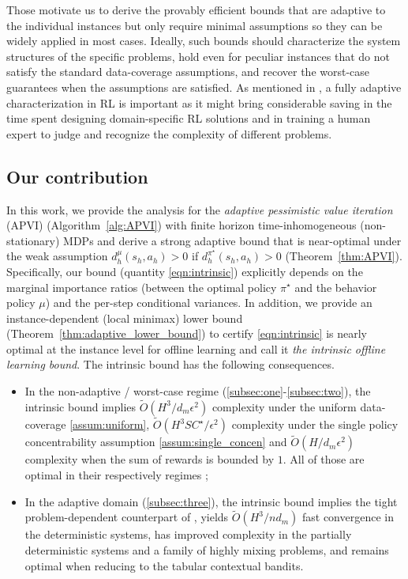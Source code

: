 Those motivate us to derive the provably efficient bounds that are adaptive to the individual instances but only require minimal assumptions so they can be widely applied in most cases. Ideally, such bounds should characterize the system structures of the specific problems, hold even for peculiar instances that do not satisfy the standard data-coverage assumptions, and recover the worst-case guarantees when the assumptions are satisfied. As mentioned in \cite{zanette2019tighter}, a fully adaptive characterization in RL is important as it might bring considerable saving in the time spent designing domain-specific RL solutions and in training a human expert to judge and recognize the complexity of different problems.

\subsection{Our contribution}\label{sec:contribution}


In this work, we provide the analysis for the \emph{adaptive pessimistic value iteration} (APVI) (Algorithm~\ref{alg:APVI}) with finite horizon time-inhomogeneous (non-stationary) MDPs and derive a strong adaptive bound that is near-optimal under the weak assumption $d^\mu_h(s_h,a_h)>0$ if $d^{\pi^\star}_h(s_h,a_h)>0$ (Theorem~\ref{thm:APVI}). Specifically, our bound (quantity \eqref{eqn:intrinsic}) explicitly depends on the marginal importance ratios (between the optimal policy $\pi^\star$ and the behavior policy $\mu$) and the per-step conditional variances. In addition, we provide an instance-dependent (local minimax) lower bound (Theorem~\ref{thm:adaptive_lower_bound}) to certify \eqref{eqn:intrinsic} is nearly optimal at the instance level for offline learning and call it \emph{the intrinsic offline learning bound}. The intrinsic bound has the following consequences.

\begin{itemize}
	\item In the non-adaptive / worst-case regime (\ref{subsec:one}-\ref{subsec:two}), the intrinsic bound implies $\widetilde{O}(H^3/d_m\epsilon^2)$ complexity under the uniform data-coverage \ref{assum:uniform}, $\tilde{O}(H^3SC^\star/\epsilon^2)$ complexity under the single policy concentrability assumption \ref{assum:single_concen} and $\widetilde{O}(H/d_m\epsilon^2)$ complexity when the sum of rewards is bounded by $1$. All of those are optimal in their respectively regimes \citep{yin2021near,rashidinejad2021bridging,xie2021policy,ren2021nearly};
	\item In the adaptive domain (\ref{subsec:three}), the intrinsic bound implies the tight problem-dependent counterpart of \cite{zanette2019tighter}, yields $\tilde{O}(H^3/nd_m)$ fast convergence in the deterministic systems, has improved complexity in the partially deterministic systems and a family of highly mixing problems, and remains optimal when reducing to the tabular contextual bandits.   
\end{itemize}

